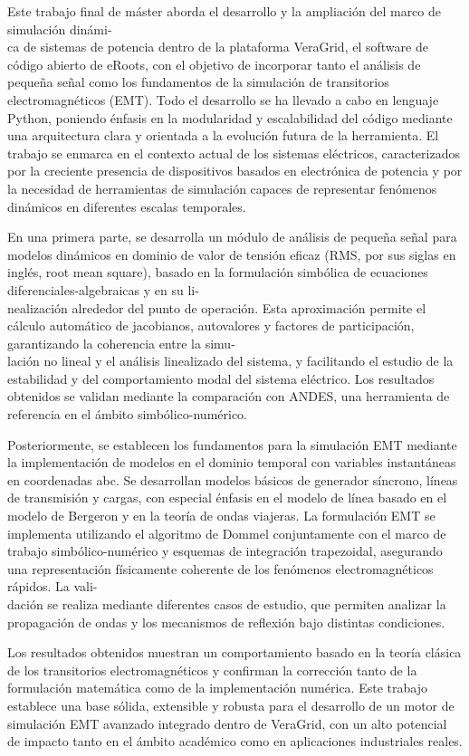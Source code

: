 Este trabajo final de máster aborda el desarrollo y la ampliación del marco de 
simulación dinámi-\\ca de sistemas de potencia dentro de la plataforma VeraGrid, el software de código abierto de eRoots,
 con el objetivo de incorporar 
tanto el análisis de pequeña señal como los fundamentos de la simulación de transitorios electromagnéticos (EMT). 
Todo el desarrollo se ha llevado a cabo en lenguaje Python, poniendo énfasis en la modularidad y escalabilidad del 
código mediante una arquitectura clara y orientada a la evolución futura de la herramienta. El trabajo se enmarca en el 
contexto actual de los sistemas eléctricos, caracterizados por la creciente presencia de dispositivos basados en electrónica 
de potencia y por la necesidad de herramientas de simulación capaces de representar fenómenos dinámicos en diferentes escalas 
temporales.

En una primera parte, se desarrolla un módulo de análisis de pequeña señal para modelos dinámicos en dominio de valor de tensión eficaz (RMS, por sus siglas en inglés, root mean square), basado 
en la formulación simbólica de ecuaciones diferenciales-algebraicas y en su li-\\nealización alrededor del punto de operación. 
Esta aproximación permite el cálculo automático de jacobianos, autovalores y factores de participación, garantizando la 
coherencia entre la simu-\\lación no lineal y el análisis linealizado del sistema, y facilitando el estudio de la estabilidad y 
del comportamiento modal del sistema eléctrico. Los resultados obtenidos se validan mediante la comparación con ANDES, 
una herramienta de referencia en el ámbito simbólico-numérico.

Posteriormente, se establecen los fundamentos para la simulación EMT mediante la implementación de modelos en el dominio 
temporal con variables instantáneas en coordenadas abc. Se desarrollan modelos básicos de generador síncrono, 
líneas de transmisión y cargas, con especial énfasis en el modelo de línea basado en el modelo de Bergeron y en la 
teoría de ondas viajeras. La formulación EMT se implementa utilizando el algoritmo de Dommel conjuntamente con el marco 
de trabajo simbólico-numérico y esquemas de integración trapezoidal, asegurando una representación físicamente coherente 
de los fenómenos electromagnéticos rápidos. La vali-\\dación se realiza mediante diferentes casos de estudio, que permiten 
analizar la propagación de ondas y los mecanismos de reflexión bajo distintas condiciones.

Los resultados obtenidos muestran un comportamiento basado en la teoría clásica de los transitorios electromagnéticos y 
confirman la corrección tanto de la formulación matemática como de la implementación numérica. 
Este trabajo establece una base sólida, extensible y robusta para el desarrollo de un motor de simulación EMT 
avanzado integrado dentro de VeraGrid, con un alto potencial de impacto tanto en el ámbito académico como en aplicaciones 
industriales reales.
